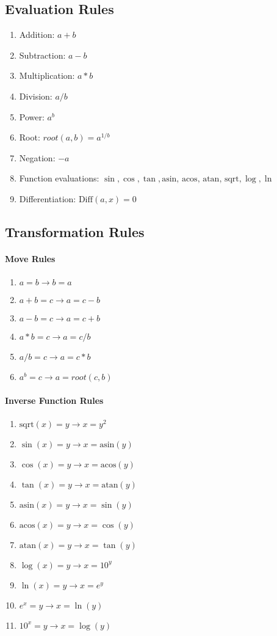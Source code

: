\documentclass{article}
\begin{document}
\subsection{Evaluation Rules}
\begin{enumerate}
\item Addition: $a + b$
\item Subtraction: $a - b$
\item Multiplication: $a * b$
\item Division: $a / b$
\item Power: $a ^ b$
\item Root: $root(a, b) = a^{1/b}$
\item Negation: $-a$
\item Function evaluations: $\sin, \cos, \tan, \text{asin, acos, atan, sqrt}, \log, \ln$
\item Differentiation: $\text{Diff}(a, x) = 0$
\end{enumerate}
\subsection{Transformation Rules}
\paragraph{Move Rules}
\begin{enumerate}
\item $a=b \rightarrow b=a$
\item $a+b=c \rightarrow a=c-b$
\item $a-b=c \rightarrow a=c+b$
\item $a*b=c \rightarrow a=c/b$
\item $a/b=c \rightarrow a=c*b$
\item $a^b=c \rightarrow a=root(c, b)$
\end{enumerate}
\paragraph{Inverse Function Rules}
\begin{enumerate}
\item $\text{sqrt}(x)=y \rightarrow x=y^2$
\item $\sin(x)=y \rightarrow x=\text{asin}(y)$
\item $\cos(x)=y \rightarrow x=\text{acos}(y)$
\item $\tan(x)=y \rightarrow x=\text{atan}(y)$
\item $\text{asin}(x)=y \rightarrow x=\sin(y)$
\item $\text{acos}(x)=y \rightarrow x=\cos(y)$
\item $\text{atan}(x)=y \rightarrow x=\tan(y)$
\item $\log(x) = y \rightarrow x = 10^y$
\item $\ln(x) = y \rightarrow x = e^y$
\item $e^x = y \rightarrow x = \ln(y)$
\item $10^x = y \rightarrow x = \log(y)$
\end{enumerate}
\end{document}
